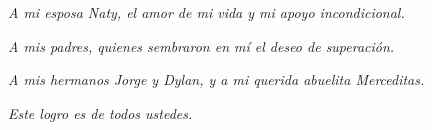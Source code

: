\vspace*{3cm}
\begin{center}
\textit{A mi esposa Naty, el amor de mi vida y mi apoyo incondicional.}

\textit{A mis padres, quienes sembraron en mí el deseo de superación.}

\textit{A mis hermanos Jorge y Dylan, y a mi querida abuelita Merceditas.}

\textit{Este logro es de todos ustedes.}
\end{center}